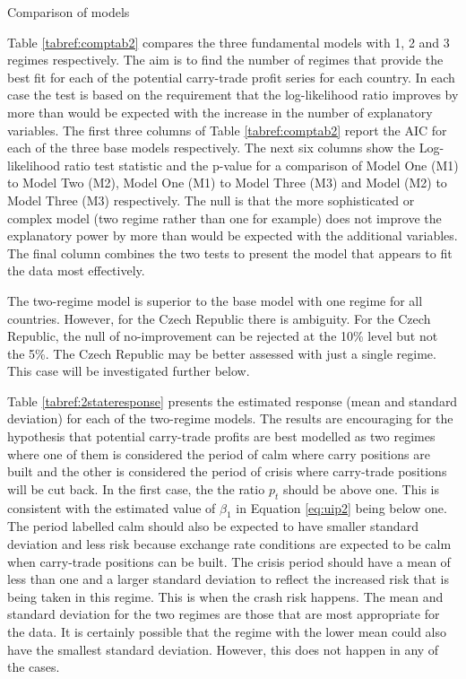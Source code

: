 \documentclass[12pt, a4paper, oneside]{article}\usepackage[]{graphicx}\usepackage[]{color}
\begin{document}
\begin{sidewaystable}[p]
\begin{threeparttable}
\begin{tablenotes}
\end{tablenotes}
\caption{Comparison of models}
\label{tabref:comptab2}
\end{threeparttable}
\end{sidewaystable}

Table \ref{tabref:comptab2} compares the three fundamental models with 1, 2 and 3 regimes respectively.  The aim is to find the number of regimes that provide the best fit for each of the potential carry-trade profit series for each country.  In each case the test is based on the requirement that the log-likelihood ratio improves by more than would be expected with the increase in the number of explanatory variables.  The first three columns of Table \ref{tabref:comptab2} report the AIC for each of the three base models respectively. The next six columns show the Log-likelihood ratio test statistic and the p-value for a comparison of Model One (M1) to Model Two (M2), Model One (M1) to Model Three (M3) and Model (M2) to Model Three (M3) respectively. The null is that the more sophisticated or complex model (two regime rather than one for example) does not improve the explanatory power by more than would be expected with the additional variables. The final column combines the two tests to present the model that appears to fit the data most effectively. 

The two-regime model is superior to the base model with one regime for all countries.  However, for the Czech Republic there is ambiguity.  For the Czech Republic, the null of no-improvement can be rejected at the 10\% level but not the 5\%.  The Czech Republic may be better assessed with just a single regime. This case will be investigated further below. 

Table \ref{tabref:2stateresponse} presents the estimated response (mean and standard deviation) for each of the two-regime models. The results are encouraging for the hypothesis that potential carry-trade profits are best modelled as two regimes where one of them is considered the period of calm where carry positions are built and the other is considered the period of crisis where carry-trade positions will be cut back.  In the first case, the the ratio $p_t$ should be above one.  This is consistent with the estimated value of $\beta_1$ in Equation \ref{eq:uip2} being below one.  The period labelled calm should also be expected to have smaller standard deviation and less risk because exchange rate conditions are expected to be calm when carry-trade positions can be built.  The crisis period should have a mean of less than one and a larger standard deviation to reflect the increased risk that is being taken in this regime. This is when the crash risk happens.  The mean and standard deviation for the two regimes are those that are most appropriate for the data.  It is certainly possible that the regime with the lower mean could also have the smallest standard deviation.  However, this does not happen in any of the cases. 
\end{document}
